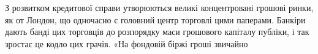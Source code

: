 З розвитком кредитової справи утворюються великі концентровані грошові
ринки, як от Лондон, що одночасно є головний центр торговлі цими паперами.
Банкіри дають банді цих торговців до розпорядку маси грошового капіталу публіки,
і так зростає це кодло цих грачів. «На фондовій біржі гроші звичайно
\parbreak{}  %

